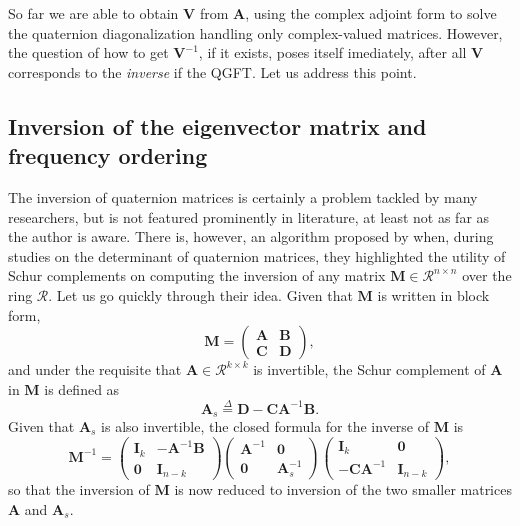 So far we are able to obtain $\mathbf{V}$ from $\mathbf{A}$, using the complex adjoint form to solve the quaternion diagonalization handling only complex-valued matrices. However, the question of how to get $\mathbf{V}^{-1}$, if it exists, poses itself imediately, after all $\mathbf{V}$ corresponds to the \textit{inverse} if the QGFT. Let us address this point.

\subsection{Inversion of the eigenvector matrix and frequency ordering}
The inversion of quaternion matrices is certainly a problem tackled by many researchers, but is not featured prominently in literature, at least not as far as the author is aware. There is, however, an algorithm proposed by \cite{cohen1999quaternionic} when, during studies on the determinant of quaternion matrices, they highlighted the utility of Schur complements on computing the inversion of any matrix $\mathbf{M} \in \mathcal{R}^{n \times n}$ over the ring $\mathcal{R}$. Let us go quickly through their idea. Given that $\mathbf{M}$ is written in block form,
\begin{equation}
\label{eq:block}
\mathbf{M} = \begin{pmatrix}
\mathbf{A} & \mathbf{B} \\
\mathbf{C} & \mathbf{D}
\end{pmatrix},
\end{equation}
and under the requisite that $\mathbf{A} \in \mathcal{R}^{k \times k}$ is invertible, the Schur complement of $\mathbf{A}$ in $\mathbf{M}$ is defined as
\begin{equation}
\mathbf{A}_s \overset{\Delta}{=} \mathbf{D}
- \mathbf{C}\mathbf{A}^{-1} \mathbf{B}.
\end{equation}
Given that $\mathbf{A}_s$ is also invertible, the closed formula for the inverse of $\mathbf{M}$ is
\begin{equation}
\label{eq:schur}
\mathbf{M}^{-1} = 
\begin{pmatrix}
\mathbf{I}_k & - \mathbf{A}^{-1} \mathbf{B} \\
\mathbf{0} & \mathbf{I}_{n - k}
\end{pmatrix}
\begin{pmatrix}
\mathbf{A}^{-1} & \mathbf{0} \\
\mathbf{0} & \mathbf{A}_s^{-1}
\end{pmatrix}
\begin{pmatrix}
\mathbf{I}_k & \mathbf{0} \\
- \mathbf{C} \mathbf{A}^{-1} & \mathbf{I}_{n - k}
\end{pmatrix},
\end{equation}
so that the inversion of $\mathbf{M}$ is now reduced to inversion of the two smaller matrices $\mathbf{A}$ and $\mathbf{A}_s$.

